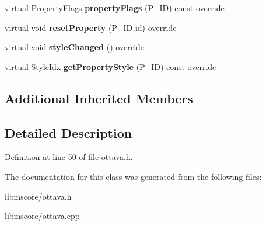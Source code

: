 \begin{DoxyCompactItemize}
virtual Property\+Flags {\bfseries property\+Flags} (P\+\_\+\+ID) const override
\item 
\mbox{\label{class_ms_1_1_ottava_segment_a99abdfd757fb06e37acee24e7294dc49}} 
virtual void {\bfseries reset\+Property} (P\+\_\+\+ID id) override
\item 
\mbox{\label{class_ms_1_1_ottava_segment_aed7bb54be16540366a33b2ad97154a01}} 
virtual void {\bfseries style\+Changed} () override
\item 
\mbox{\label{class_ms_1_1_ottava_segment_ad220d8ea2018e6dde9f17910ac0dae8b}} 
virtual Style\+Idx {\bfseries get\+Property\+Style} (P\+\_\+\+ID) const override
\end{DoxyCompactItemize}
\subsection*{Additional Inherited Members}


\subsection{Detailed Description}


Definition at line 50 of file ottava.\+h.



The documentation for this class was generated from the following files\+:\begin{DoxyCompactItemize}
\item 
libmscore/ottava.\+h\item 
libmscore/ottava.\+cpp\end{DoxyCompactItemize}
